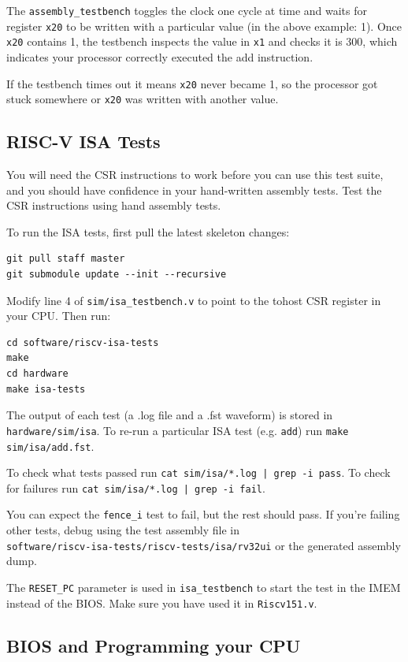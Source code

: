 \documentclass[11pt]{article}
\begin{document}
The \verb|assembly_testbench| toggles the clock one cycle at time and waits for register \verb|x20| to be written with a particular value (in the above example: 1).
Once \verb|x20| contains 1, the testbench inspects the value in \verb|x1| and checks it is 300, which indicates your processor correctly executed the add instruction.

If the testbench times out it means \verb|x20| never became 1, so the processor got stuck somewhere or \verb|x20| was written with another value.

\subsection{RISC-V ISA Tests}
You will need the CSR instructions to work before you can use this test suite, and you should have confidence in your hand-written assembly tests.
Test the CSR instructions using hand assembly tests.

To run the ISA tests, first pull the latest skeleton changes:
\begin{verbatim}
git pull staff master
git submodule update --init --recursive
\end{verbatim}

Modify line 4 of \verb|sim/isa_testbench.v| to point to the tohost CSR register in your CPU.
Then run:

\begin{verbatim}
cd software/riscv-isa-tests
make
cd hardware
make isa-tests
\end{verbatim}

The output of each test (a .log file and a .fst waveform) is stored in \verb|hardware/sim/isa|.
To re-run a particular ISA test (e.g. \verb|add|) run \verb|make sim/isa/add.fst|.

To check what tests passed run \texttt{cat sim/isa/*.log | grep -i pass}.
To check for failures run \texttt{cat sim/isa/*.log | grep -i fail}.

You can expect the \verb|fence_i| test to fail, but the rest should pass.
If you're failing other tests, debug using the test assembly file in\\\verb|software/riscv-isa-tests/riscv-tests/isa/rv32ui| or the generated assembly dump.

The \verb|RESET_PC| parameter is used in \verb|isa_testbench| to start the test in the IMEM instead of the BIOS.
Make sure you have used it in \verb|Riscv151.v|.

\subsection{BIOS and Programming your CPU}
\label{bios_info}
\end{document}
